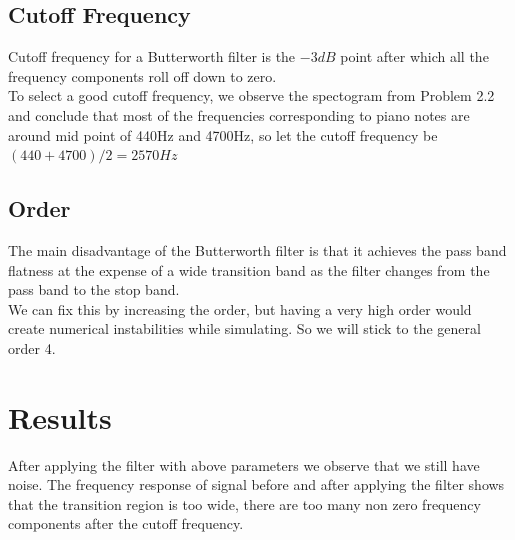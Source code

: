 \documentclass[journal,12pt,twocolumn]{IEEEtran}
\begin{document}
  \subsection{\textbf{Cutoff Frequency}}
  Cutoff frequency for a Butterworth filter is the $-3dB$ point after which all the frequency components roll off down to zero.\\
  To select a good cutoff frequency, we observe the spectogram from Problem 2.2 and conclude that most of the frequencies corresponding to piano notes are around mid point of 440Hz and 4700Hz, so let the cutoff frequency be $(440+4700)/2 = 2570Hz$

  \subsection{\textbf{Order}}
  The main disadvantage of the Butterworth filter is that it achieves the pass band flatness at the expense of a wide transition band as the filter changes from the pass band to the stop band.\\
  We can fix this by increasing the order, but having a very high order would create numerical instabilities while simulating. So we will stick to the general order 4.
  
\section{\textbf{Results}}
    After applying the filter with above parameters we observe that we still have noise. The frequency response of signal before and after applying the filter shows that the transition region is too wide, there are too many non zero frequency components after the cutoff frequency.
\\
\\
\\
\\
\\
\\
\\
\\
\captionsetup[figure]{labelformat=empty}
\end{document}

